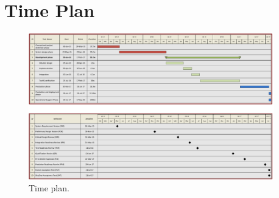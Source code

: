 \chapter{Time Plan}

\begin{figure}[H]
\centering
\includegraphics[width=0.95\textwidth]
{Billeder/Tidsplan.pdf}
\caption{Time plan.}
\label{fig:WBS}
\end{figure}